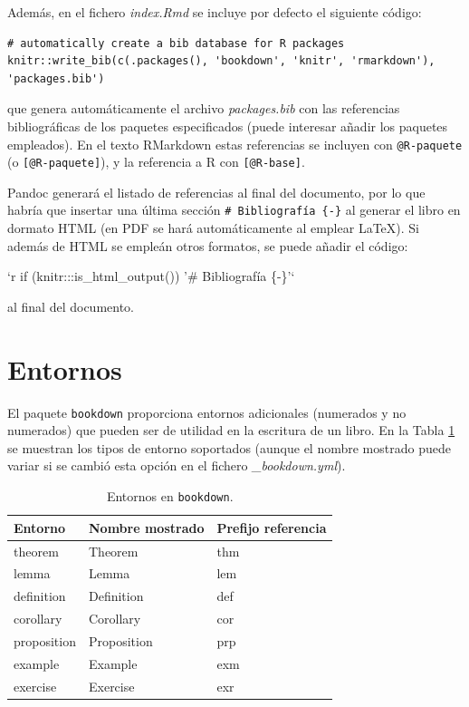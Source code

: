 \documentclass[]{book}
\newenvironment{Shaded}{\begin{snugshade}}{\end{snugshade}}
\newcommand{\BaseNTok}[1]{\textcolor[rgb]{0.00,0.00,0.81}{#1}}
\theoremstyle{definition}
\theoremstyle{definition}
\theoremstyle{definition}
\theoremstyle{remark}
\begin{document}
Además, en el fichero \emph{index.Rmd} se incluye por defecto el
siguiente código:

\begin{verbatim}
# automatically create a bib database for R packages
knitr::write_bib(c(.packages(), 'bookdown', 'knitr', 'rmarkdown'), 'packages.bib')
\end{verbatim}

que genera automáticamente el archivo \emph{packages.bib} con las
referencias bibliográficas de los paquetes especificados (puede
interesar añadir los paquetes empleados). En el texto RMarkdown estas
referencias se incluyen con \texttt{@R-paquete} (o
\texttt{{[}@R-paquete{]}}), y la referencia a R \citep{R-base} con
\texttt{{[}@R-base{]}}.

Pandoc generará el listado de referencias al final del documento, por lo
que habría que insertar una última sección
\texttt{\#\ Bibliografía\ \{-\}} al generar el libro en dormato HTML (en
PDF se hará automáticamente al emplear LaTeX). Si además de HTML se
empleán otros formatos, se puede añadir el código:

\begin{Shaded}
\begin{Highlighting}[]
\BaseNTok{`r if (knitr:::is_html_output()) '# Bibliografía \{-\}'`}
\end{Highlighting}
\end{Shaded}

al final del documento.

\section{Entornos}\label{entornos}

El paquete \texttt{bookdown} proporciona entornos adicionales (numerados
y no numerados) que pueden ser de utilidad en la escritura de un libro.
En la Tabla \ref{tab:theorem-envs} se muestran los tipos de entorno
soportados (aunque el nombre mostrado puede variar si se cambió esta
opción en el fichero \emph{\_bookdown.yml}).



\begin{table}

\caption{\label{tab:theorem-envs}Entornos en \texttt{bookdown}.}
\centering
\begin{tabular}[t]{lll}
\toprule
Entorno & Nombre mostrado & Prefijo referencia\\
\midrule
theorem & Theorem & thm\\
lemma & Lemma & lem\\
definition & Definition & def\\
corollary & Corollary & cor\\
proposition & Proposition & prp\\
\addlinespace
example & Example & exm\\
exercise & Exercise & exr\\
\bottomrule
\end{tabular}
\end{table}
\end{document}

